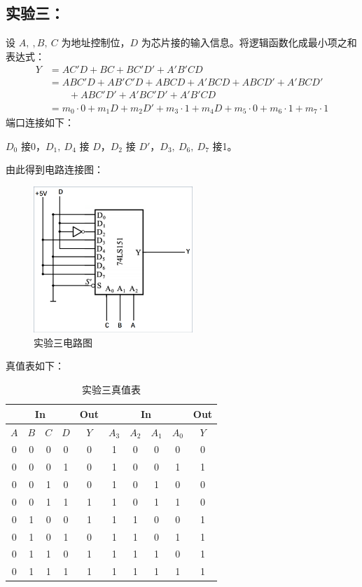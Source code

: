 \documentclass[a4paper,11pt,UTF8]{ctexart}
\begin{document}
 \subsection{实验三：\expc}
  \p 设 $A,\ ,B,\ C$ 为地址控制位，$D$ 为芯片接的输入信息。将逻辑函数化成最小项之和表达式：
  \begin{align*}
	 Y&=AC'D+BC+BC'D'+A'B'CD\\
	 &=ABC'D+AB'C'D+ABCD+A'BCD+ABCD'+A'BCD'\\
	 &\qquad+ABC'D'+A'BC'D'+A'B'CD\\
	 &=m_0\cdot0+m_1D+m_2D'+m_3\cdot1+m_4D
	 +m_5\cdot0+m_6\cdot1+m_7\cdot1
  \end{align*}
  \p 端口连接如下：
  \begin{center}
   \kaishu $D_0$ 接0，$D_1,\ D_4$ 接 $D$，$D_2$ 接 $D'$，$D_3,\ D_6,\ D_7$ 接1。
  \end{center}
  \p 由此得到电路连接图：
  \begin{figure}[H]
   \centering
   \includegraphics[width=6cm]{Exp03}
   \caption{实验三电路图}
   \label{fig:Exp03}
  \end{figure}
  \p 真值表如下：
  \begin{table}[H]
   \centering
   \begin{tabular}{|cccc|c|cccc|c|}\hline
    \multicolumn{4}{|c|}{In} &Out 
    &\multicolumn{4}{|c|}{In} &Out
    \\\hline
    $A$ &$B$ &$C$ &$D$ &$Y$ &
    $A_3$ &$A_2$ &$A_1$ &$A_0$ &$Y$
    \\\hline
    0 &0 &0 &0	&0 &
    1 &0 &0 &0	&0\\
    0 &0 &0 &1	&0 &
    1 &0 &0 &1	&1\\
    0 &0 &1 &0	&0 &
    1 &0 &1 &0	&0\\
    0 &0 &1 &1	&1 &
    1 &0 &1 &1	&0\\
    0 &1 &0 &0	&1 &
    1 &1 &0 &0	&1\\
    0 &1 &0 &1	&0 &
    1 &1 &0 &1	&1\\
    0 &1 &1 &0	&1 &
    1 &1 &1 &0	&1\\
    0 &1 &1 &1	&1 &
    1 &1 &1 &1	&1
    \\\hline
   \end{tabular}
   \caption{实验三真值表}
   \label{tab:Exp03}
  \end{table}
\end{document}
